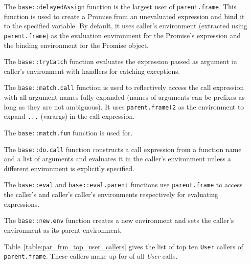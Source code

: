 \documentclass[10pt,review,sigplan,authorversion=true]{acmart}
\renewcommand{\c}[1]{\lstinline |#1|\xspace}
\begin{document}
The \c{base::delayedAssign} function is the largest user of \c{parent.frame}.
This function is used to create a Promise from an unevaluated expression and
bind it to the specified variable. By default, it uses caller's environment
(extracted using \c{parent.frame}) as the evaluation environment for the
Promise's expression and the binding environment for the Promise object.

The \c{base::tryCatch} function evaluates the expression passed as argument in
caller's environment with handlers for catching exceptions.

The \c{base::match.call} function is used to reflectively access the call
expression with all argument names fully expanded (names of arguments can be
prefixes as long as they are not ambiguous). It uses \c{parent.frame(2} as the
environment to expand \c{...} (varargs) in the call expression.

The \c{base::match.fun} function is used for.

The \c{base::do.call} function constructs a call expression from a function name
and a list of arguments and evaluates it in the caller's environment unless a
different environment is explicitly specified.

The \c{base::eval} and \c{base::eval.parent} functions use \c{parent.frame} to
access the caller's and caller's caller's environments respectively for
evaluating expressions.

The \c{base::new.env} function creates a new environment and sets the caller's
environment as its parent environment.

Table~\ref{table:par_frm_top_user_callers} gives the list of top ten \c{User}
callers of \c{parent.frame}. These callers make up for
\ParentFrameUserTopTenCallPerc of all \emph{User} calls.
\end{document}
